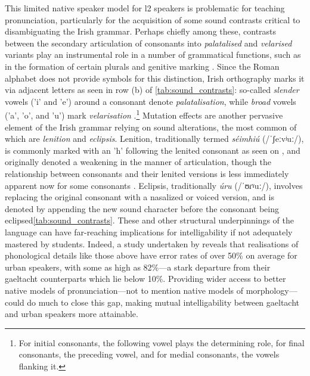\documentclass[thesis]{cluu}
\newcommand{\ipa}[1]{{\ipafont #1}}
\begin{document}
This limited native speaker model for \gls{l2} speakers is problematic for teaching pronunciation, particularly for the acquisition of some sound contrasts critical to disambiguating the Irish grammar. Perhaps chiefly among these, contrasts between the secondary articulation of consonants into \textit{palatalised} and \textit{velarised} variants play an instrumental role in a number of grammatical functions, such as in the formation of certain plurals and genitive marking \parencite{snesarevaPalatalizationDublinIrish2016,gabrieleEnglishInfluenceL2,broinNewUrbanIrish2014,stensonModernIrishComprehensive2020}. Since the Roman alphabet does not provide symbols for this distinction, Irish orthography marks it via adjacent letters as seen in row (b) of \cref{tab:sound_contrasts}: so-called \textit{slender} vowels ('i' and 'e') around a consonant denote \textit{palatalisation}, while \textit{broad} vowels ('a', 'o', and 'u') mark \textit{velarisation} \parencite{stensonModernIrishComprehensive2020}.\footnote{For initial consonants, the following vowel plays the determining role, for final consonants, the preceding vowel, and for medial consonants, the vowels flanking it.} Mutation effects are another pervasive element of the Irish grammar relying on sound alterations, the most common of which are \textit{lenition} and \textit{eclipsis}. Lenition, traditionally termed \textit{séimhiú} (/\ipa{ˈʃeːvʲuː}/), is commonly marked with an 'h' following the lenited consonant as seen on , and originally denoted a weakening in the manner of articulation, though the relationship between consonants and their lenited versions is less immediately apparent now for some consonants \parencite{stensonModernIrishComprehensive2020}. Eclipsis, traditionally \textit{úru} (/\ipa{ˈʊɾˠuː}/), involves replacing the original consonant with a nasalized or voiced version, and is denoted by appending the new sound character before the consonant being eclipsed\ref{tab:sound_contrasts}. These and other structural underpinnings of the language can have far-reaching implications for intelligability if not adequately mastered by students. Indeed, a study undertaken by \textcite{broinNewUrbanIrish2014} reveals that realisations of phonological details like those above have error rates of over 50\% on average for urban speakers, with some as high as 82\%---a stark departure from their gaeltacht counterparts which lie below 10\%. Providing wider access to better native models of pronunciation---not to mention native models of morphology---could do much to close this gap, making mutual intelligability between gaeltacht and urban speakers more attainable. 
\end{document}
